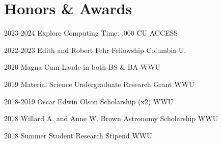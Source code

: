 \documentclass[]{scoggins-cv} %
\begin{document}
\section{Honors \& Awards}

\begin{entrylist}

    \entry
    {2023-2024}
	{Explore Computing Time: {,000 CU}}
    {ACCESS}
    {%
        \vspace*{-1.1em}
    }

    \entry
    {2022-2023}
    {Edith and Robert Fehr Fellowship}
    {Columbia U.}
    {%
        \vspace*{-1.1em}
    }

    \entry
    {2020}
    {Magna Cum Laude in both BS \& BA}
    {WWU}
    {%
        \vspace*{-1.1em}
    }

    \entry
    {2019}
    {Material Science Undergraduate Research Grant}
    {WWU}
    {%
        \vspace*{-1.1em}
    }

    \entry
    {2018-2019}
    {Oscar Edwin Olson Scholarship (x2)} %
    {WWU}
    {%
        \vspace*{-1.1em}
    }

    \entry
    {2018}
    {Willard A. and Anne W. Brown Astronomy Scholarship} %
    {WWU}
    {%
        \vspace*{-1.1em}
    }

    \entry
    {2018}
    {Summer Student Research Stipend} %
    {WWU}
    {%
        \vspace*{-1.1em}
    }

\end{entrylist}
\iffalse
\aside{References}{0.0325}{
}
\fi
\end{document}
